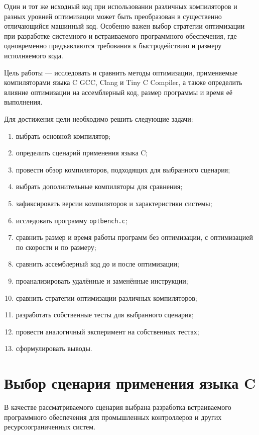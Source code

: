 \documentclass[12pt,a4paper]{article}
\begin{document}
Один и тот же исходный код при использовании различных компиляторов и разных уровней оптимизации может быть преобразован в существенно отличающийся машинный код. Особенно важен выбор стратегии оптимизации при разработке системного и встраиваемого программного обеспечения, где одновременно предъявляются требования к быстродействию и размеру исполняемого кода.

Цель работы --- исследовать и сравнить методы оптимизации, применяемые компиляторами языка C GCC, Clang и Tiny C Compiler, а также определить влияние оптимизации на ассемблерный код, размер программы и время её выполнения.

Для достижения цели необходимо решить следующие задачи:
\begin{enumerate}
    \item выбрать основной компилятор;
    \item определить сценарий применения языка C;
    \item провести обзор компиляторов, подходящих для выбранного сценария;
    \item выбрать дополнительные компиляторы для сравнения;
    \item зафиксировать версии компиляторов и характеристики системы;
    \item исследовать программу \texttt{optbench.c};
    \item сравнить размер и время работы программ без оптимизации, с оптимизацией по скорости и по размеру;
    \item сравнить ассемблерный код до и после оптимизации;
    \item проанализировать удалённые и заменённые инструкции;
    \item сравнить стратегии оптимизации различных компиляторов;
    \item разработать собственные тесты для выбранного сценария;
    \item провести аналогичный эксперимент на собственных тестах;
    \item сформулировать выводы.
\end{enumerate}

\section{Выбор сценария применения языка C}

В качестве рассматриваемого сценария выбрана разработка встраиваемого программного обеспечения для промышленных контроллеров и других ресурсоограниченных систем.
\end{document}
